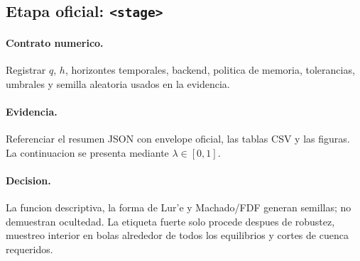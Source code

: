 \subsection{Etapa oficial: \texttt{<stage>}}
\paragraph{Contrato numerico.}
Registrar \(q\), \(h\), horizontes temporales, backend, politica de memoria,
tolerancias, umbrales y semilla aleatoria usados en la evidencia.

\paragraph{Evidencia.}
Referenciar el resumen JSON con envelope oficial, las tablas CSV y las figuras.
La continuacion se presenta mediante \(\lambda\in[0,1]\).

\paragraph{Decision.}
La funcion descriptiva, la forma de Lur'e y Machado/FDF generan semillas; no
demuestran ocultedad. La etiqueta fuerte solo procede despues de robustez,
muestreo interior en bolas alrededor de todos los equilibrios y cortes de
cuenca requeridos.
